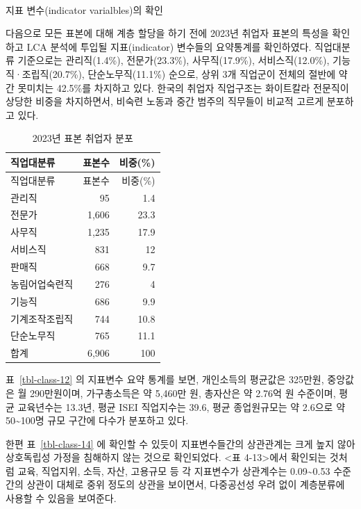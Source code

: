 \documentclass[
  letterpaper,
  DIV=11,
  numbers=noendperiod]{scrartcl}
\makeatletter
\let\oldparagraph\paragraph
\renewcommand{\paragraph}{
    \@ifstar
      \xxxParagraphStar
      \xxxParagraphNoStar
  }
\newcommand{\xxxParagraphStar}[1]{\oldparagraph*{#1}\mbox{}}
\newcommand{\xxxParagraphNoStar}[1]{\oldparagraph{#1}\mbox{}}
\makeatother
\begin{document}
\paragraph{지표 변수(indicator varialbles)의
확인}\label{uxc9c0uxd45c-uxbcc0uxc218indicator-varialblesuxc758-uxd655uxc778}

다음으로 모든 표본에 대해 계층 할당을 하기 전에 2023년 취업자 표본의
특성을 확인하고 LCA 분석에 투입될 지표(indicator) 변수들의 요약통계를
확인하였다. 직업대분류 기준으로는 관리직(1.4\%), 전문가(23.3\%),
사무직(17.9\%), 서비스직(12.0\%), 기능직·조립직(20.7\%),
단순노무직(11.1\%) 순으로, 상위 3개 직업군이 전체의 절반에 약간 못미치는
42.5\%를 차지하고 있다. 한국의 취업자 직업구조는 화이트칼라 전문직이
상당한 비중을 차지하면서, 비숙련 노동과 중간 범주의 직무들이 비교적
고르게 분포하고 있다.

\begin{longtable}[]{@{}lrr@{}}
\caption{2023년 표본 취업자 분포}\label{tbl-class-11}\tabularnewline
\toprule\noalign{}
직업대분류 & 표본수 & 비중(\%) \\
\midrule\noalign{}
\endfirsthead
\toprule\noalign{}
직업대분류 & 표본수 & 비중(\%) \\
\midrule\noalign{}
\endhead
\bottomrule\noalign{}
\endlastfoot
관리직 & 95 & 1.4 \\
전문가 & 1,606 & 23.3 \\
사무직 & 1,235 & 17.9 \\
서비스직 & 831 & 12 \\
판매직 & 668 & 9.7 \\
농림어업숙련직 & 276 & 4 \\
기능직 & 686 & 9.9 \\
기계조작조립직 & 744 & 10.8 \\
단순노무직 & 765 & 11.1 \\
합계 & 6,906 & 100 \\
\end{longtable}

표~\ref{tbl-class-12} 의 지표변수 요약 통계를 보면, 개인소득의 평균값은
325만원, 중앙값은 월 290만원이며, 가구총소득은 약 5,460만 원, 총자산은
약 2.76억 원 수준이며, 평균 교육년수는 13.3년, 평균 ISEI 직업지수는
39.6, 평균 종업원규모는 약 2.6으로 약 50\textasciitilde100명 규모 구간에
다수가 분포하고 있다.

한편 표~\ref{tbl-class-14} 에 확인할 수 있듯이 지표변수들간의 상관관계는
크게 높지 않아 상호독립성 가정을 침해하지 않는 것으로 확인되었다.
\textless 표 4-13\textgreater 에서 확인되는 것처럼 교육, 직업지위, 소득,
자산, 고용규모 등 각 지표변수가 상관계수는 0.09\textasciitilde0.53 수준
간의 상관이 대체로 중위 정도의 상관을 보이면서, 다중공선성 우려 없이
계층분류에 사용할 수 있음을 보여준다.
\end{document}
